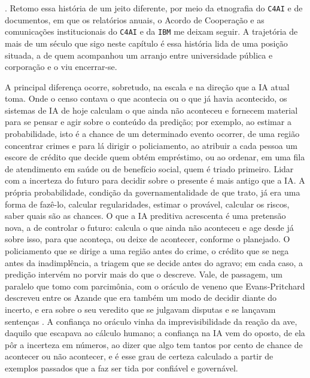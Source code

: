 \parencite{Wiggins2023Data}. Retomo essa história de um jeito diferente, por meio da etnografia do \texttt{C4AI} e de documentos, em que os relatórios anuais, o Acordo de Cooperação e as comunicações institucionais do \texttt{C4AI} e da \texttt{IBM} me deixam seguir. A trajetória de mais de um século que sigo neste capítulo é essa história lida de uma posição situada, a de quem acompanhou um arranjo entre universidade pública e corporação e o viu encerrar-se.

A principal diferença ocorre, sobretudo, na escala e na direção que a IA atual toma. Onde o censo contava o que acontecia ou o que já havia acontecido, os sistemas de IA de hoje calculam o que ainda não aconteceu e fornecem material para se pensar e agir sobre o conteúdo da predição; por exemplo, ao estimar a probabilidade, isto é a chance de um determinado evento ocorrer, de uma região concentrar crimes e para lá dirigir o policiamento, ao atribuir a cada pessoa um escore de crédito que decide quem obtém empréstimo, ou ao ordenar, em uma fila de atendimento em saúde ou de benefício social, quem é triado primeiro. Lidar com a incerteza do futuro para decidir sobre o presente é mais antigo que a IA. A própria probabilidade, condição da governamentalidade de que trato, já era uma forma de fazê-lo, calcular regularidades, estimar o provável, calcular os riscos, saber quais são as chances. O que a IA preditiva acrescenta é uma pretensão nova, a de controlar o futuro: calcula o que ainda não aconteceu e age desde já sobre isso, para que aconteça, ou deixe de acontecer, conforme o planejado. O policiamento que se dirige a uma região antes do crime, o crédito que se nega antes da inadimplência, a triagem que se decide antes do agravo; em cada caso, a predição intervém no porvir mais do que o descreve. Vale, de passagem, um paralelo que tomo com parcimônia, com o oráculo de veneno que Evans-Pritchard descreveu entre os Azande que era também um modo de decidir diante do incerto, e era sobre o seu veredito que se julgavam disputas e se lançavam sentenças \parencite{EvansPritchard2005Bruxaria}. A confiança no oráculo vinha da imprevisibilidade da reação da ave, daquilo que escapava ao cálculo humano; a confiança na IA vem do oposto, de ela pôr a incerteza em números, ao dizer que algo tem tantos por cento de chance de acontecer ou não acontecer, e é esse grau de certeza calculado a partir de exemplos passados que a faz ser tida por confiável e governável.

